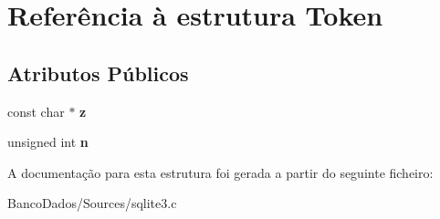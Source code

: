 \hypertarget{struct_token}{\section{Referência à estrutura Token}
\label{struct_token}
}
\subsection*{Atributos Públicos}
\begin{DoxyCompactItemize}
\item 
\hypertarget{struct_token_a57b502141e3018e4a02773424acb4ffd}{const char $\ast$ {\bfseries z}}\label{struct_token_a57b502141e3018e4a02773424acb4ffd}

\item 
\hypertarget{struct_token_ad8442439e00ab9713a9b91a53e44c2aa}{unsigned int {\bfseries n}}\label{struct_token_ad8442439e00ab9713a9b91a53e44c2aa}

\end{DoxyCompactItemize}


A documentação para esta estrutura foi gerada a partir do seguinte ficheiro\-:\begin{DoxyCompactItemize}
\item 
Banco\-Dados/\-Sources/sqlite3.\-c\end{DoxyCompactItemize}
